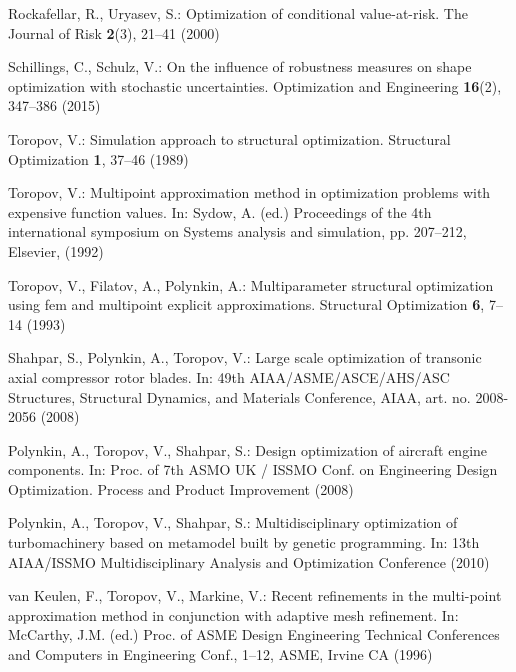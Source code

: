 \documentclass{llncs}
\begin{document}
\begin{thebibliography}{10}

Rockafellar, R., Uryasev, S.:
\newblock Optimization of conditional value-at-risk.
\newblock The Journal of Risk \textbf{2}(3), 21--41 (2000)

Schillings, C., Schulz, V.:
\newblock On the influence of robustness measures on shape optimization with stochastic uncertainties.
\newblock Optimization and Engineering \textbf{16}(2), 347--386 (2015)

Toropov, V.:
\newblock Simulation approach to structural optimization.
\newblock Structural Optimization \textbf{1}, 37--46 (1989)

Toropov, V.:
\newblock Multipoint approximation method in optimization problems with expensive function values.
\newblock In: Sydow, A. (ed.) Proceedings of the 4th international symposium on Systems analysis and simulation, 
pp. 207--212, Elsevier,  (1992)

Toropov, V., Filatov, A., Polynkin, A.:
\newblock Multiparameter structural optimization using fem and multipoint explicit approximations.
\newblock Structural Optimization \textbf{6}, 7--14 (1993)

Shahpar, S., Polynkin, A., Toropov, V.:
\newblock Large scale optimization of transonic axial compressor rotor blades.
\newblock In:  49th AIAA/ASME/ASCE/AHS/ASC Structures, Structural Dynamics, and Materials Conference, AIAA, art. no. 2008-2056
 (2008)

Polynkin, A., Toropov, V., Shahpar, S.:
\newblock Design optimization of aircraft engine components.
\newblock In: Proc. of 7th ASMO UK / ISSMO Conf. on Engineering Design Optimization. Process and Product Improvement (2008)

Polynkin, A., Toropov, V., Shahpar, S.:
\newblock Multidisciplinary optimization of turbomachinery based on metamodel built by genetic programming.
\newblock In: 13th AIAA/ISSMO Multidisciplinary Analysis and Optimization Conference (2010)

van Keulen, F., Toropov, V., Markine, V.:
\newblock Recent refinements in the multi-point approximation method in conjunction with adaptive mesh refinement.
\newblock In: McCarthy, J.M. (ed.) Proc. of ASME Design Engineering Technical Conferences and Computers
  in Engineering Conf., 1--12, ASME, Irvine CA (1996)


\end{thebibliography}
\end{document}
